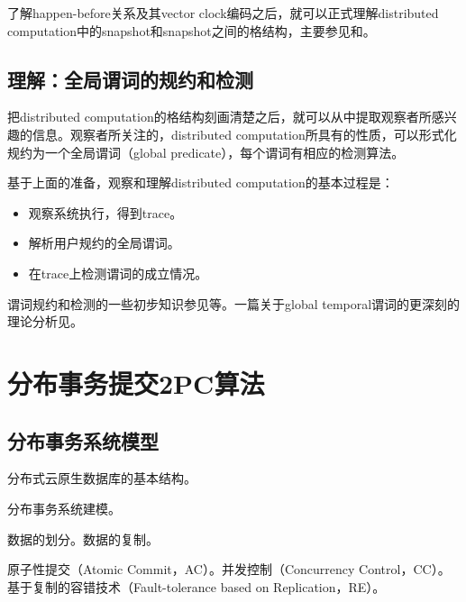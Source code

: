 \documentclass[UTF8]{ctexrep}
\begin{document}
了解happen-before关系及其vector clock编码之后，就可以正式理解distributed computation中的snapshot和snapshot之间的格结构，主要参见\cite{Mattern89}和\cite{Babaoglu93}。

\section{理解：全局谓词的规约和检测}

把distributed computation的格结构刻画清楚之后，就可以从中提取观察者所感兴趣的信息。观察者所关注的，distributed computation所具有的性质，可以形式化规约为一个全局谓词（global predicate），每个谓词有相应的检测算法。

基于上面的准备，观察和理解distributed computation的基本过程是：

\begin{itemize}
    \item 观察系统执行，得到trace。
    \item 解析用户规约的全局谓词。
    \item 在trace上检测谓词的成立情况。
\end{itemize}

谓词规约和检测的一些初步知识参见\cite{Chandy85, Cooper91, Babaoglu95}等。一篇关于global temporal谓词的更深刻的理论分析见\cite{Charron95}。



\chapter{分布事务提交2PC算法} \label{Chap_2PC}

\section{分布事务系统模型}

分布式云原生数据库的基本结构。

分布事务系统建模。

数据的划分。数据的复制。

原子性提交（Atomic Commit，AC）。并发控制（Concurrency Control，CC）。基于复制的容错技术（Fault-tolerance based on Replication，RE）。

\end{document}
